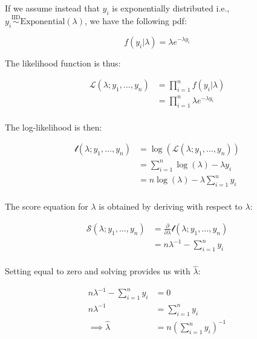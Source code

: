 \documentclass{report}
\begin{document}
If we assume instead that $y_i$ is exponentially distributed i.e., $y_i \overset{\text{IID}}{\sim}\text{Exponential}(\lambda)$, we have the following \gls{pdf}:

\begin{equation}\label{eq:ex-glm-mle-exponential-dist}
    f(y_i|\lambda) = \lambda e^{-\lambda y_i}
\end{equation}

The likelihood function is thus:

\begin{equation}\label{eq:ex-glm-mle-exponential-likelihood}
    \begin{aligned}
        \mathcal{L}(\lambda;y_1, \dots, y_n) 
          &= \prod_{i=1}^n f(y_i|\lambda) \\
          &= \prod_{i=1}^n \lambda e^{-\lambda y_i} \\
    \end{aligned}
\end{equation}

The log-likelihood is then:

\begin{equation}\label{eq:ex-glm-mle-exponential-loglik}
    \begin{aligned}
        \mathcal{l}(\lambda;y_1, \dots, y_n) 
          &= \log\left(\mathcal{L}(\lambda;y_1, \dots, y_n)\right) \\
          &= \sum_{i=1}^n \log(\lambda) - \lambda y_i \\
          &= n\log(\lambda) - \lambda\sum_{i=1}^n y_i \\
    \end{aligned}
\end{equation}

The score equation for $\lambda$ is obtained by deriving with respect to $\lambda$:

\begin{equation}\label{eq:ex-glm-mle-exponential-score-equation}
    \begin{aligned}
        \mathcal{S}(\lambda; y_1, \dots, y_n)
          &= \frac{\partial}{\partial\lambda} \mathcal{l}(\lambda;y_1, \dots, y_n) \\
          &= n\lambda^{-1} - \sum_{i=1}^n y_i \\
    \end{aligned}
\end{equation}

Setting equal to zero and solving provides us with $\hat{\lambda}$:

\begin{equation}\label{eq:ex-glm-mle-exponential-lambda-mle}
    \begin{aligned}
        n\lambda^{-1} - \sum_{i=1}^n y_i &= 0 \\
        n\lambda^{-1} &= \sum_{i=1}^n y_i \\
        \implies \hat{\lambda} &= n\left(\sum_{i=1}^n y_i\right)^{-1} \\
    \end{aligned}
\end{equation}
\end{document}
